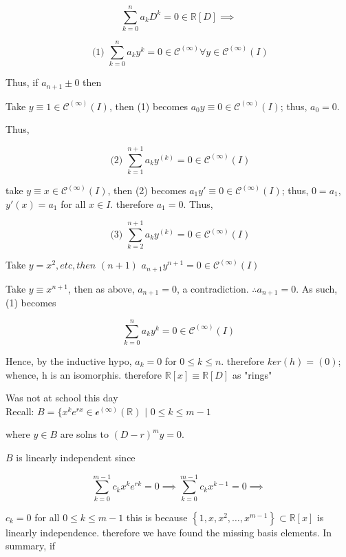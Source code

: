 \[   \sum_{k=0}^n a_kD^k = 0 \in \mathbb{R}[D] \implies \]

\[ \text{ (1) }  \sum_{k=0}^n a_ky^k = 0 \in \mathscr{C}^{(\infty)} \forall y \in
\mathscr{C}^{(\infty)}(I) \]

Thus, if \( a_{n+1} \pm 0 \) then 

Take \( y \equiv 1 \in \mathscr{C}^{(\infty)}(I)\), then (1)
becomes \( a_0y \equiv 0 \in \mathscr{C}^{(\infty)}(I) \); thus, \( a_0
= 0\). 

Thus, 

\[ \text{ (2) } \sum_{k=1}^{n+1} a_ky^{(k)} =0 \in \mathscr{C}^{(\infty)}(I) \]

take \( y \equiv x \in \mathscr{C}^{(\infty)}(I) \), then (2) becomes \(
a_1y' \equiv 0 \in \mathscr{C}^{(\infty)}(I)\); thus, \( 0 = a_1\), \(y'(x) =
a_1\) for all \( x \in I \). therefore \( a_1 = 0 \). Thus, 

\[ \text{ (3) } \sum_{k=2}^{n+1}a_ky^{(k)} = 0 \in \mathscr{C}^{(\infty)}(I)\]

Take \( y = x^2, etc, then  \) \( (n+1) \) \( a_{n+1}y^{n+1} = 0 \in \mathscr{C}^{(\infty)}(I) \)

Take \( y \equiv x^{n+1} \), then as above, \( a_{n+1} = 0 \), a
contradiction. \( \therefore a_{n+1} =0\). As such, (1) becomes 

\[ \sum_{k=0}^n a_ky^k = 0 \in \mathscr{C}^{(\infty)}(I) \]

Hence, by the inductive hypo, \( a_k =0 \) for \( 0 \leq k \leq n \).
therefore \( ker(h) = (0) \); whence, h is an isomorphis. therefore \(
\mathbb{R}[x] \equiv \mathbb{R}[D]  \) as "rings"

Was not at school this day\\ 

Recall: \( B = \{ x^k e^{rx} \in \mathscr{c}^{(\infty)} ( \mathbb{R})
\text{ | } 0 \leq k \leq m-1\)

where \( y \in B \) are solns to \( (D-r)^my=0 \). 

\( B \) is linearly independent since 

\[ \sum_{k=0}^{m-1} c_k x^k e^{rk} = 0 \implies \sum_{k=0}^{m-1}
c_kx^{k-1} = 0 \implies\]

\( c_k = 0  \) for all \( 0 \leq k \leq m-1 \) this is because \(
\left\{ 1, x, x^2, \dots , x^{m-1} \right\} \subset \mathbb{R}[x]\)
is linearly independence. therefore we have found the missing basis
elements. In summary, if 

